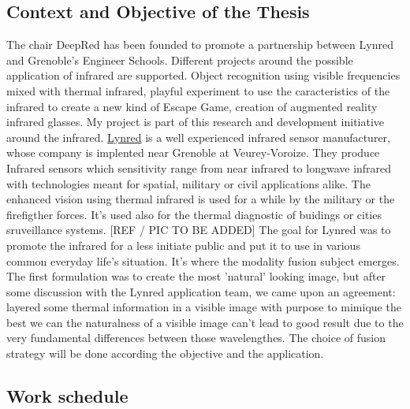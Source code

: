 \documentclass[12pt, english]{article}
\begin{document}
        \subsection{Context and Objective of the Thesis}
            The chair DeepRed has been founded to promote a partnership between Lynred and Grenoble's Engineer Schools. Different projects around 
            the possible application of infrared are supported. Object recognition using visible frequencies mixed with thermal infrared, playful 
            experiment to use the caracteristics of the infrared to create a new kind of Escape Game, creation of augmented reality infrared glasses.
            My project is part of this research and development initiative around the infrared. \href{https://lynred.com/fr}{Lynred} is a well experienced infrared sensor manufacturer,
            whose company is implented near Grenoble at Veurey-Voroize. They produce Infrared sensors which sensitivity range from near infrared to 
            longwave infrared with technologies meant for spatial, military or civil applications alike. The enhanced vision using thermal infrared is used
            for a while by the military or the firefigther forces. It's used also for the thermal diagnostic of buidings or cities sruveillance systems. 
            [REF / PIC TO BE ADDED]
            The goal for Lynred was to promote the infrared for a less initiate public and put it to use 
            in various common everyday life's situation. It's where the modality fusion subject emerges. The first formulation was to create the most 'natural' 
            looking image, but after some discussion with the Lynred application team, we came upon an agreement: layered some thermal information in a visible image 
            with purpose to mimique the best we can the naturalness of a visible image can't lead to good result due to the very fundamental differences between those 
            wavelengthes. The choice of fusion strategy will be done according the objective and the application.

        \subsection{Work schedule}
\end{document}
